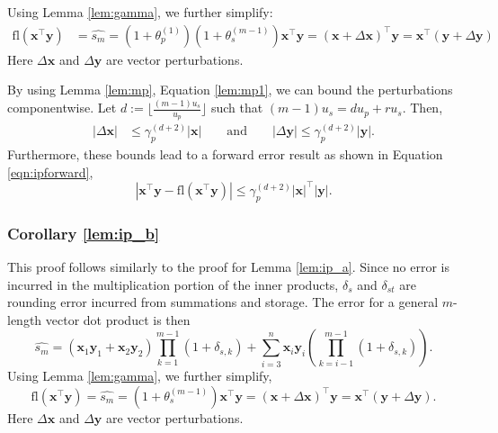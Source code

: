\documentclass[review,onefignum,onetabnum]{siamart190516}
\newcommand{\dd}{\delta}
\newcommand{\tth}{\theta}
\newcommand{\bb}[1]{\mathbf{#1}}
\newcommand{\fl}{\mathrm{fl}}
\begin{document}
Using Lemma \ref{lem:gamma}, we further simplify:
\begin{align*}
\fl(\bb{x}^{\top}\bb{y}) &= \hat{s_m} = (1+\tth_p^{(1)})(1+\tth_s^{(m-1)})\bb{x}^{\top}\bb{y}%
= (\bb{x}+\Delta\bb{x})^{\top}\bb{y} = \bb{x}^{\top}(\bb{y}+\Delta\bb{y})
\end{align*}
Here $\Delta\bb{x}$ and $\Delta\bb{y}$ are vector perturbations.

By using Lemma \ref{lem:mp}, Equation \ref{lem:mp1}, we can bound the perturbations componentwise.
Let $d:=\lfloor\frac{(m-1)u_s}{u_p}\rfloor$ such that $(m-1)u_s = d u_p + r u_s$. Then,
\begin{align*}
|\Delta \bb{x}| &\leq \gamma_p^{(d+2)}|\bb{x}| %
\qquad \mbox{and} \qquad
|\Delta \bb{y}| %
\leq \gamma_p^{(d+2)}|\bb{y}|.
\end{align*}
Furthermore, these bounds lead to a forward error result as shown in Equation \ref{eqn:ipforward},
\begin{equation}
\label{eqn:ipforward}
|\bb{x}^{\top}\bb{y}-\fl(\bb{x}^{\top}\bb{y})| \leq \gamma_p^{(d+2)}|\bb{x}|^{\top}|\bb{y}|.
\end{equation}
%
%

\subsubsection{Corollary \ref{lem:ip_b}}
This proof follows similarly to the proof for Lemma \ref{lem:ip_a}.
Since no error is incurred in the multiplication portion of the inner products, $\dd_s$ and $\dd_{st}$ are rounding error incurred from summations and storage.
The error for a general $m$-length vector dot product is then
\begin{equation}
\label{eqn:dperr_2}
\hat{s_m} = (\bb{x}_1\bb{y}_1+\bb{x}_2\bb{y}_2)\prod_{k=1}^{m-1}(1+\dd_{s,k}) + \sum_{i=3}^n \bb{x}_i\bb{y}_i\left(\prod_{k=i-1}^{m-1}(1+\dd_{s,k})\right).
\end{equation}
Using Lemma \ref{lem:gamma}, we further simplify, 
\begin{equation*}
\fl(\bb{x}^{\top}\bb{y}) = \hat{s_m} = (1+\tth_s^{(m-1)})\bb{x}^{\top}\bb{y}= (\bb{x}+\Delta\bb{x})^{\top}\bb{y} = \bb{x}^{\top}(\bb{y}+\Delta\bb{y}).
\end{equation*}
Here $\Delta\bb{x}$ and $\Delta\bb{y}$ are vector perturbations.
\end{document}
